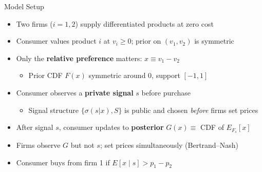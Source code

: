 \documentclass[aspectratio=169, 11pt]{beamer}
\begin{document}
\begin{frame}{Model Setup}

\begin{itemize}
    \item Two firms ($i = 1,2$) supply differentiated products at zero cost

    \medskip

    \item Consumer values product $i$ at $v_i \geq 0$; prior on $(v_1, v_2)$ is symmetric

    \medskip

    \item Only the \textbf{relative preference} matters: $x \equiv v_1 - v_2$
    \begin{itemize}
        \item Prior CDF $F(x)$ symmetric around 0, support $[-1,1]$
    \end{itemize}

    \medskip

    \item Consumer observes a \textbf{private signal} $s$ before purchase
    \begin{itemize}
        \item Signal structure $\{\sigma(s|x), S\}$ is public and chosen \emph{before} firms set prices
    \end{itemize}

    \medskip

    \item After signal $s$, consumer updates to \textbf{posterior} $G(x) \equiv$ CDF of $E_{F_s}[x]$

    \medskip

    \item Firms observe $G$ but not $s$; set prices simultaneously (Bertrand--Nash)

    \medskip

    \item Consumer buys from firm 1 if $E[x \mid s] > p_1 - p_2$
\end{itemize}

\end{frame}
\end{document}

